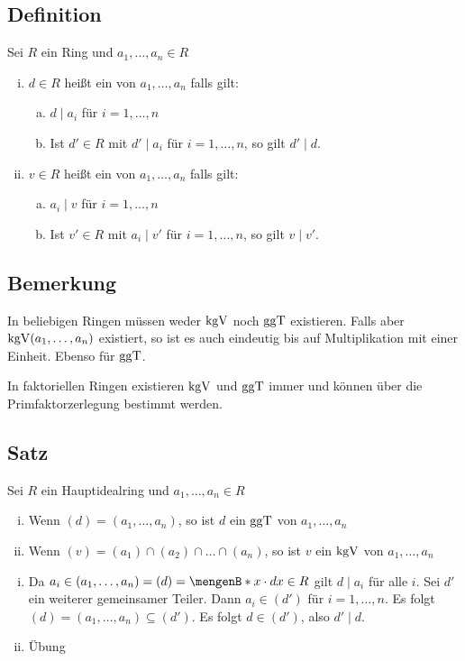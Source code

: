 \subsection[Definition: $\ggT$ und $\kgV$]{Definition} %
\label{sub:713}
Sei $R$ ein Ring und $a_1, \ldots , a_n \in R$
\begin{enumerate}[i)]
	\item $d \in R$ heißt ein  von $a_1, \ldots , a_n$ falls gilt:
	\begin{enumerate}[(a)]
		\item $d \mid a_i$ für $i=1,\ldots ,n$
		\item Ist $d' \in R$ mit $d' \mid a_i$ für $i=1,\ldots ,n$, so gilt $d' \mid d$.
	\end{enumerate} 
	\item $v \in R$ heißt ein  von $a_1, \ldots , a_n$ falls gilt:
	\begin{enumerate}[(a)]
		\item $a_i \mid v$ für $i=1, \ldots ,n$
		\item Ist $v' \in R$ mit $a_i \mid v'$ für $i=1,\ldots ,n$, so gilt $v \mid v'$.
	\end{enumerate} 
\end{enumerate}

\subsection[Bemerkung: Existenz von $\ggT$ und $\kgV$]{Bemerkung} %
\label{sub:714}
In beliebigen Ringen müssen weder $\kgV$ noch $\ggT$ existieren. Falls aber $\operatorname{kgV} (a_1, \ldots , a_n)$ existiert, so ist es auch eindeutig bis auf Multiplikation mit einer Einheit. Ebenso für $\ggT$.

In faktoriellen Ringen existieren $\kgV$ und $\ggT$ immer und können über die Primfaktorzerlegung bestimmt werden.

\subsection[Satz: Zusammenhang zwischen Idealen und $\ggT$ und $\kgV$]{Satz} %
\label{sub:715}
Sei $R$ ein Hauptidealring und $a_1,\ldots ,a_n \in R$
\begin{enumerate}[i)]
	\item Wenn $(d) = (a_1, \ldots ,a_n)$, so ist $d$ ein $\ggT$ von $a_1, \ldots ,a_n$
	\item Wenn $(v) = (a_1) \cap (a_2) \cap \ldots \cap (a_n)$, so ist $v$ ein $\kgV$ von $a_1, \ldots , a_n$
\end{enumerate}
\begin{enumerate}[i)]
	\item Da $a_i \in (a_1, \ldots ,a_n) = (d) =  \set[x \cdot d]{x \in R} $ gilt $d \mid a_i$ für alle $i$. Sei $d'$ ein weiterer gemeinsamer Teiler. Dann $a_i \in (d')$
	für $i=1,\ldots ,n$. Es folgt $(d) = (a_1, \ldots , a_n) \subseteq (d')$. Es folgt $d \in (d')$, also $d' \mid d$.
	\item Übung
\end{enumerate}

